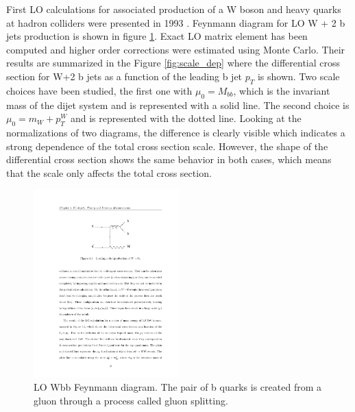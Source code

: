 \par First LO calculations for associated production of a W boson and heavy quarks at hadron colliders were presented in 1993 \cite{Mangano:1992kp}. Feynmann diagram for LO W + 2 b jets production is shown in figure \ref{fig:LO_diag}. Exact LO matrix element has been computed and higher order corrections were estimated using Monte Carlo. Their results are summarized in the Figure \ref{fig:scale_dep} where the differential cross section for W+2 b jets as a function of the leading b jet $p_T$ is shown. Two scale choices have been studied, the first one with $\mu_0=M_{bb}$, which is the invariant mass of the dijet system and is represented with a solid line. The second choice is $\mu_0=m_W+p_T^W$ and is represented with the dotted line. Looking at the normalizations of two diagrams, the difference is clearly visible which indicates a strong dependence of the total cross section scale. However, the shape of the differential cross section shows the same behavior in both cases, which means that the scale only affects the total cross section.      
\begin{figure}[htbp]
	\centering
		\includegraphics[width=0.5\textwidth]{Figures/LO_diag.pdf}
	\caption[LO Wbb Feynmann diagram]{LO Wbb Feynmann diagram. The pair of b quarks is created from a gluon through a process called gluon splitting.}
	\label{fig:LO_diag}
\end{figure}
